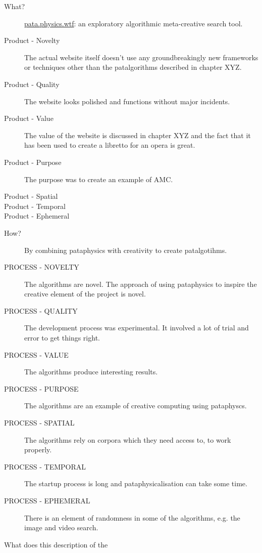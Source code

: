 \begin{description}
  \item[What?] \url{pata.physics.wtf}: an exploratory algorithmic meta-creative search tool.
  \item[Product - Novelty] The actual website itself doesn't use any groundbreakingly new frameworks or techniques other than the patalgorithms described in chapter XYZ. 
  \item[Product - Quality] The website looks polished and functions without major incidents.
  \item[Product - Value] The value of the website is discussed in chapter XYZ and the fact that it has been used to create a libretto for an opera is great.
  \item[Product - Purpose] The purpose was to create an example of \ac{AMC}.
  \item[Product - Spatial] 
  \item[Product - Temporal]
  \item[Product - Ephemeral]
\end{description}

\spirals

\begin{description}
  \item[How?] By combining pataphysics with creativity to create patalgotihms.
  \item[PROCESS - NOVELTY] The algorithms are novel. The approach of using pataphysics to inspire the creative element of the project is novel.
  \item[PROCESS - QUALITY] The development process was experimental. It involved a lot of trial and error to get things right.
  \item[PROCESS - VALUE] The algorithms produce interesting results.
  \item[PROCESS - PURPOSE] The algorithms are an example of creative computing using pataphyscs.
  \item[PROCESS - SPATIAL] The algorithms rely on corpora which they need access to, to work properly.
  \item[PROCESS - TEMPORAL] The startup process is long and pataphysicalisation can take some time.
  \item[PROCESS - EPHEMERAL] There is an element of randomness in some of the algorithms, e.g. the image and video search.
\end{description}

What does this description of the 

